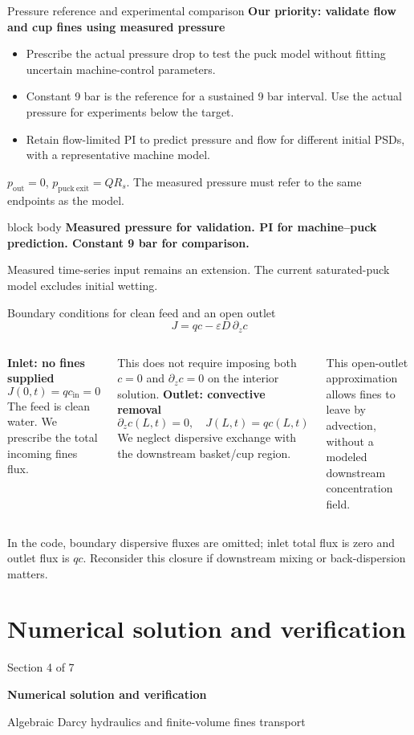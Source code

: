 \documentclass[aspectratio=169,11pt]{beamer}
\newcommand{\hi}[1]{\textcolor{tumblue}{\textbf{#1}}}
\newcommand{\takeaway}[1]{%
  \begin{beamercolorbox}[rounded=true,sep=.55em]{block body}
    \centering\color{tumdark}\textbf{#1}
  \end{beamercolorbox}}
\newcommand{\slidesource}[1]{\par\vfill{\tiny\color{tumgray}#1}}
\begin{document}
\begin{frame}{Pressure reference and experimental comparison}
\small
\hi{Our priority: validate flow and cup fines using measured pressure}
\begin{itemize}
\item Prescribe the actual pressure drop to test the puck model without fitting uncertain machine-control parameters.
\item Constant 9 bar is the reference for a sustained 9 bar interval. Use the actual pressure for experiments below the target.
\item Retain flow-limited PI to predict pressure and flow for different initial PSDs, with a representative machine model.
\end{itemize}
\medskip
$p_{\mathrm{out}}=0$, $p_{\mathrm{puck\ exit}}=Q R_s$.
The measured pressure must refer to the same endpoints as the model.
\par\medskip
\takeaway{Measured pressure for validation. PI for machine--puck prediction. Constant 9 bar for comparison.}
\slidesource{Measured time-series input remains an extension. The current saturated-puck model excludes initial wetting.}
\end{frame}

\begin{frame}{Boundary conditions for clean feed and an open outlet}
\small
\[J=qc-\varepsilon D\,\partial_zc\]
\begin{columns}[T,onlytextwidth]
\hi{Inlet: no fines supplied}
\[J(0,t)=q c_{\mathrm{in}}=0\]
The feed is clean water. We prescribe the total incoming fines flux.
\par\medskip
This does not require imposing both $c=0$ and $\partial_zc=0$ on the interior solution.
\hi{Outlet: convective removal}
\[\partial_zc(L,t)=0,\quad J(L,t)=qc(L,t)\]
We neglect dispersive exchange with the downstream basket/cup region.
\par\medskip
This open-outlet approximation allows fines to leave by advection, without a modeled downstream concentration field.
\end{columns}
\vfill
\small In the code, boundary dispersive fluxes are omitted; inlet total flux is zero and outlet flux is $qc$. Reconsider this closure if downstream mixing or back-dispersion matters.
\end{frame}

\section[Numerics]{Numerical solution and verification}
\begin{frame}{}
\vfill
{\large\color{tumgray}Section 4 of 7}\par\vspace{0.4cm}
{\LARGE\color{tumblue}\textbf{Numerical solution and verification}}\par\vspace{0.5cm}
{\large Algebraic Darcy hydraulics and finite-volume fines transport}
\vfill
\end{frame}
\end{document}
